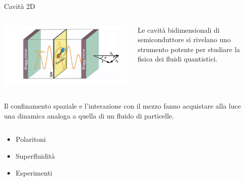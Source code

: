 \documentclass[10pt]{beamer}
\begin{document}
 \begin{frame}{Cavità 2D}
 \transwipe[direction=270]
 \small

\begin{minipage}{\textwidth}
  \begin{columns}
  
  \begin{column}{.6\textwidth}
    \includegraphics[scale=.2]{files/QW_color.png}
  \end{column}

  \begin{column}{.4\textwidth}
    Le cavità bidimensionali di semiconduttore si rivelano uno strumento potente per studiare la fisica dei fluidi quantistici.
    \end{column}
  \end{columns}
  \end{minipage}
  
  Il confinamento spaziale e l'interazione con il mezzo fanno acquistare alla luce una dinamica analoga a quella di un fluido di particelle.
  
  \begin{minipage}{\textwidth}
  \begin{columns}
  
  \begin{column}{.5\textwidth}
    \begin{itemize}
     \item Polaritoni
     \item Superfluidità
     \item Esperimenti
    \end{itemize}

  \end{column}


\end{columns}
\end{minipage}
\end{frame}
\end{document}
